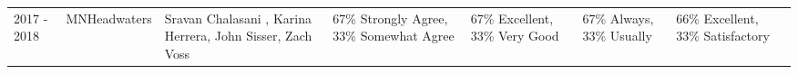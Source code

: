 
\begin{supertabular}{lp{2.5cm}p{3cm}p{2cm}p{2cm}p{2cm}p{2cm}}
2017 - 2018 & MNHeadwaters & Sravan Chalasani , Karina Herrera, John Sisser, Zach Voss & 67\% Strongly Agree, 33\% Somewhat Agree & 67\% Excellent, 33\% Very Good & 67\% Always, 33\% Usually & 66\% Excellent, 33\% Satisfactory \\
\end{supertabular}

